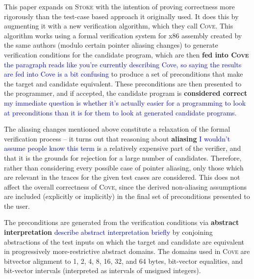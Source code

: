 \documentclass[12pt,twoside]{reedthesis}
\newcommand{\red}[1]{\textcolor{red}{#1}}
\newcommand{\comment}[2]{\textbf{#1} \textcolor{blue}{#2}}
\begin{document}
        This paper expands on \textsc{Stoke} with the intention of proving correctness more rigorously than the test-case based approach it originally used.
        It does this by augmenting it with a new verification algorithm, which they call \textsc{Cove}.
        This algorithm works using a formal verification system for x86 assembly created by the same authors \cite{sharma2013ddec} (modulo certain pointer aliasing changes) to generate verification conditions for the candidate program, which are then
            \comment{fed into \textsc{Cove}}{the paragraph reads like you're currently describing Cove, so saying the results are fed into Cove is a bit confusing}
            to produce a set of preconditions that make the target and candidate equivalent.
        These preconditions are then presented to the programmer, and if accepted, the candidate program is
            \comment{considered correct}{my immediate question is whether it's actually easier for a programming to look at preconditions than it is for them to look at generated candidate programs}.
            
        The aliasing changes mentioned above constitute a relaxation of the formal verification process -- it turns out that reasoning about
            \comment{aliasing}{I wouldn't assume people know this term}
            is a relatively expensive part of the verifier, and that it is the grounds for rejection for a large number of candidates.
        Therefore, rather than considering every possible case of pointer aliasing, only those which are relevant in the traces for the given test cases are considered.
        This does not affect the overall correctness of \textsc{Cove}, since the derived non-aliasing assumptions are included (explicitly or implicitly) in the final set of preconditions presented to the user.
            
        The preconditions are generated from the verification conditions via
            \comment{abstract interpretation}{describe abstract interpretation briefly}
            by conjoining abstractions of the test inputs on which the target and candidate are equivalent in progressively more-restrictive abstract domains.
        The domains used in \textsc{Cove} are bitvector alignment to 1, 2, 4, 8, 16, 32, and 64 bytes, bit-vector equalities, and bit-vector intervals (interpreted as intervals of unsigned integers).
            
            
\end{document}

